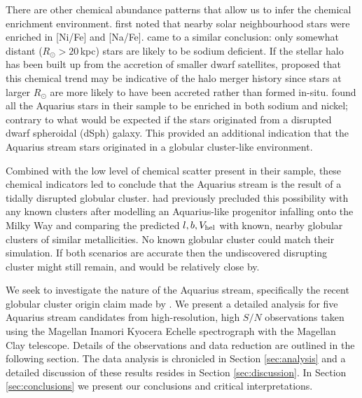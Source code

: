 \documentclass{emulateapj}
\begin{document}
There are other chemical abundance patterns that allow us to infer the chemical enrichment environment. \citet{nissen;schuster_1997} first noted that nearby solar neighbourhood stars were enriched in [Ni/Fe] and [Na/Fe]. \citet{fulbright_2000} came to a similar conclusion: only somewhat distant ($R_\odot > 20$\,kpc) stars are likely to be sodium deficient. If the stellar halo has been built up from the accretion of smaller dwarf satellites, \citet{nissen;schuster_1997} proposed that this chemical trend may be indicative of the halo merger history since stars at larger $R_\odot$ are more likely to have been accreted rather than formed in-situ. \citet{wylie-de-boer;et-al_2012} found all the Aquarius stars in their sample to be enriched in both sodium and nickel; contrary to what would be expected if the stars originated from a disrupted dwarf spheroidal (dSph) galaxy. This provided an additional indication that the Aquarius stream stars originated in a globular cluster-like environment.

Combined with the low level of chemical scatter present in their sample, these chemical indicators led \citet{wylie-de-boer;et-al_2012} to conclude that the Aquarius stream is the result of a tidally disrupted globular cluster. \citet{williams;et-al_2011} had previously precluded this possibility with any known clusters after modelling an Aquarius-like progenitor infalling onto the Milky Way and comparing the predicted $l, b, V_{\rm hel}$ with known, nearby globular clusters of similar metallicities. No known globular cluster could match their simulation. If both scenarios are accurate then the undiscovered disrupting cluster might still remain, and would be relatively close by.

We seek to investigate the nature of the Aquarius stream, specifically the recent globular cluster origin claim made by \citet{wylie-de-boer;et-al_2012}. We present a detailed analysis for five Aquarius stream candidates from high-resolution, high $S/N$ observations taken using the Magellan Inamori Kyocera Echelle spectrograph \citep{bernstein;et-al_2003} with the Magellan Clay telescope. Details of the observations and data reduction are outlined in the following section. The data analysis is chronicled in Section \ref{sec:analysis} and a detailed discussion of these results resides in Section \ref{sec:discussion}. In Section \ref{sec:conclusions} we present our conclusions and critical interpretations.
\end{document}
